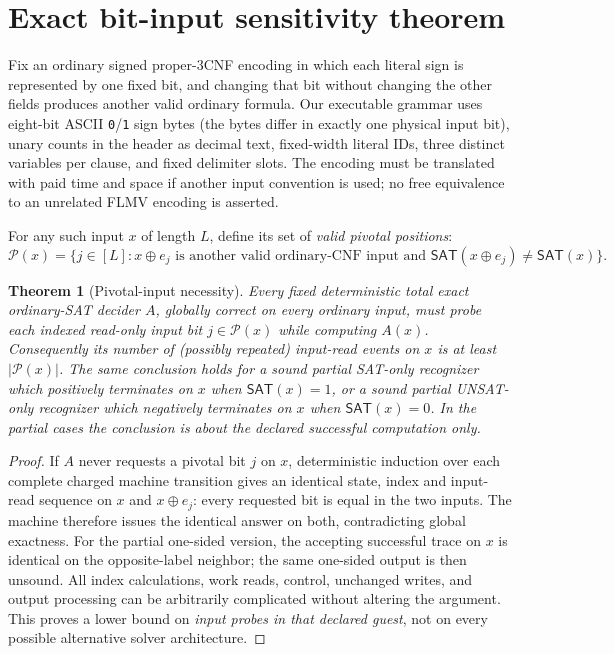 \documentclass[11pt]{article}
\newtheorem{theorem}{Theorem}
\newcommand{\SAT}{\mathsf{SAT}}
\begin{document}
\section{Exact bit-input sensitivity theorem}
Fix an ordinary signed proper-3CNF encoding in which each literal
sign is represented by one fixed bit, and changing that bit without
changing the other fields produces another valid ordinary formula.
Our executable grammar uses eight-bit ASCII \texttt{0}/\texttt{1}
sign bytes (the bytes differ in exactly one physical input bit),
unary counts in the header as decimal text, fixed-width literal IDs,
three distinct variables per clause, and fixed delimiter slots.
The encoding must be translated with paid time and space if another
input convention is used; no free equivalence to an unrelated
FLMV encoding is asserted.

For any such input $x$ of length $L$, define its set of
\emph{valid pivotal positions}:
\[
 \mathcal P(x)=\{j\in[L]:x\oplus e_j
  \text{ is another valid ordinary-CNF input and }
  \SAT(x\oplus e_j)\ne\SAT(x)\}.
\]
\begin{theorem}[Pivotal-input necessity]\label{th:pivot}
Every fixed deterministic total exact ordinary-SAT decider $A$,
globally correct on every ordinary input, must probe each indexed
read-only input bit $j\in\mathcal P(x)$ while computing $A(x)$.
Consequently its number of (possibly repeated) input-read events
on $x$ is at least $|\mathcal P(x)|$.
The same conclusion holds for a sound partial SAT-only recognizer
which positively terminates on $x$ when $\SAT(x)=1$, or a sound
partial UNSAT-only recognizer which negatively terminates on $x$
when $\SAT(x)=0$. In the partial cases the conclusion is about
the declared \emph{successful computation} only.
\end{theorem}
\begin{proof}
If $A$ never requests a pivotal bit $j$ on $x$, deterministic
induction over each complete charged machine transition gives an
identical state, index and input-read sequence on $x$ and
$x\oplus e_j$: every requested bit is equal in the two inputs.
The machine therefore issues the identical answer on both,
contradicting global exactness. For the partial one-sided version,
the accepting successful trace on $x$ is identical on the
opposite-label neighbor; the same one-sided output is then unsound.
All index calculations, work reads, control, unchanged writes,
and output processing can be arbitrarily complicated without
altering the argument. This proves a lower bound on \emph{input
probes in that declared guest}, not on every possible alternative
solver architecture.
\end{proof}
\end{document}
